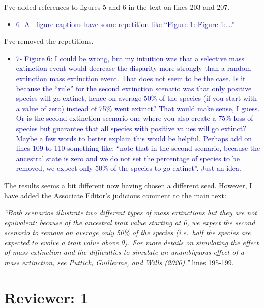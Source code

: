 \documentclass[
]{article}
\providecommand{\tightlist}{%
  \setlength{\itemsep}{0pt}\setlength{\parskip}{0pt}}
\begin{document}
I've added references to figures 5 and 6 in the text on lines 203 and
207.

\begin{itemize}
\tightlist
\item
  \textcolor{blue}{6- All figure captions have some repetition like ``Figure 1: Figure
  1:\ldots.''}
\end{itemize}

I've removed the repetitions.

\begin{itemize}
\tightlist
\item
  \textcolor{blue}{7- Figure 6: I could be wrong, but my intuition was that a selective
  mass extinction event would decrease the disparity more strongly than
  a random extinction mass extinction event. That does not seem to be
  the case. Is it because the ``rule'' for the second extinction
  scenario was that only positive species will go extinct, hence on
  average 50\% of the species (if you start with a value of zero)
  instead of 75\% went extinct? That would make sense, I guess. Or is
  the second extinction scenario one where you also create a 75\% loss
  of species but guarantee that all species with positive values will go
  extinct? Maybe a few words to better explain this would be helpful.
  Perhaps add on lines 109 to 110 something like: ``note that in the
  second scenario, because the ancestral state is zero and we do not set
  the percentage of species to be removed, we expect only 50\% of the
  species to go extinct''. Just an idea.}
\end{itemize}

The results seems a bit different now having chosen a different seed.
However, I have added the Associate Editor's judicious comment to the
main text:

\emph{``Both scenarios illustrate two different types of mass
extinctions but they are not equivalent: because of the ancestral trait
value starting at 0, we expect the second scenario to remove on average
only 50\% of the species (i.e.~half the species are expected to evolve a
trait value above 0). For more details on simulating the effect of mass
extinction and the difficulties to simulate an unambiguous effect of a
mass extinction, see Puttick, Guillerme, and Wills (2020).''} lines
195-199.

\hypertarget{reviewer-1}{%
\section{Reviewer: 1}\label{reviewer-1}}
\end{document}
